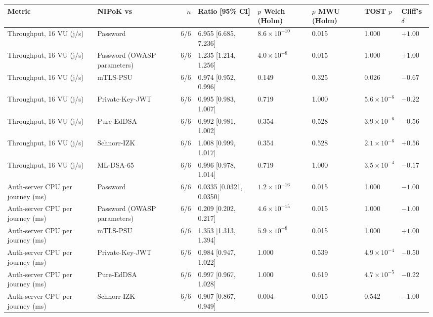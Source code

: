 \begin{tabular}{@{}llrlllll@{}}
\toprule
Metric & NIPoK vs & $n$ & Ratio [95\% CI] & $p$ Welch (Holm) & $p$ MWU (Holm) & TOST $p$ & Cliff's $\delta$ \\
\midrule
Throughput, 16 VU (j/s) & Password & 6/6 & 6.955 [6.685, 7.236] & $8.6\times10^{-10}$ & 0.015 & 1.000 & $+1.00$ \\
Throughput, 16 VU (j/s) & Password (OWASP parameters) & 6/6 & 1.235 [1.214, 1.256] & $4.0\times10^{-8}$ & 0.015 & 1.000 & $+1.00$ \\
Throughput, 16 VU (j/s) & mTLS-PSU & 6/6 & 0.974 [0.952, 0.996] & 0.149 & 0.325 & 0.026 & $-0.67$ \\
Throughput, 16 VU (j/s) & Private-Key-JWT & 6/6 & 0.995 [0.983, 1.007] & 0.719 & 1.000 & $5.6\times10^{-6}$ & $-0.22$ \\
Throughput, 16 VU (j/s) & Pure-EdDSA & 6/6 & 0.992 [0.981, 1.002] & 0.354 & 0.528 & $3.9\times10^{-6}$ & $-0.56$ \\
Throughput, 16 VU (j/s) & Schnorr-IZK & 6/6 & 1.008 [0.999, 1.017] & 0.354 & 0.528 & $2.1\times10^{-6}$ & $+0.56$ \\
Throughput, 16 VU (j/s) & ML-DSA-65 & 6/6 & 0.996 [0.978, 1.014] & 0.719 & 1.000 & $3.5\times10^{-4}$ & $-0.17$ \\
Auth-server CPU per journey (ms) & Password & 6/6 & 0.0335 [0.0321, 0.0350] & $1.2\times10^{-16}$ & 0.015 & 1.000 & $-1.00$ \\
Auth-server CPU per journey (ms) & Password (OWASP parameters) & 6/6 & 0.209 [0.202, 0.217] & $4.6\times10^{-15}$ & 0.015 & 1.000 & $-1.00$ \\
Auth-server CPU per journey (ms) & mTLS-PSU & 6/6 & 1.353 [1.313, 1.394] & $5.9\times10^{-8}$ & 0.015 & 1.000 & $+1.00$ \\
Auth-server CPU per journey (ms) & Private-Key-JWT & 6/6 & 0.984 [0.947, 1.022] & 1.000 & 0.539 & $4.9\times10^{-4}$ & $-0.50$ \\
Auth-server CPU per journey (ms) & Pure-EdDSA & 6/6 & 0.997 [0.967, 1.028] & 1.000 & 0.619 & $4.7\times10^{-5}$ & $-0.22$ \\
Auth-server CPU per journey (ms) & Schnorr-IZK & 6/6 & 0.907 [0.867, 0.949] & 0.004 & 0.015 & 0.542 & $-1.00$ \\

\end{tabular}
